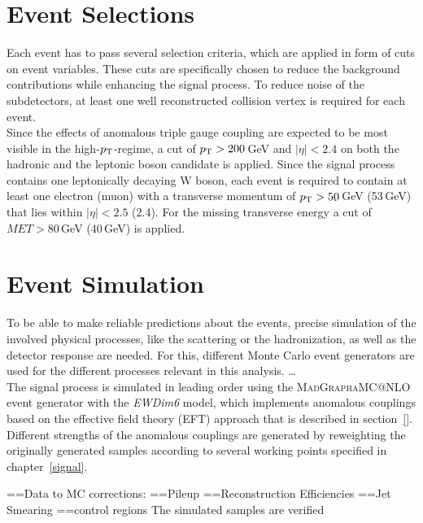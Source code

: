 \section{Event Selections}
\label{sec:eventselection}
Each event has to pass several selection criteria, which are applied in form of cuts on event variables. These cuts are specifically chosen to reduce the background contributions while enhancing the signal process. To reduce noise of the subdetectors, at least one well reconstructed collision vertex is required for each event.\\

\noindent Since the effects of anomalous triple gauge coupling are expected to be most visible in the high-$p_{\rm T}$-regime, a cut of $p_{\rm T}>200$\,GeV and $|\eta|<2.4$ on both the hadronic and the leptonic boson candidate is applied.
Since the signal process contains one leptonically decaying W boson, each event is required to contain at least one electron (muon) with a transverse momentum of $p_{\rm T}>50$\,GeV (53\,GeV) that lies within $|\eta|<2.5$ (2.4). For the missing transverse energy a cut of $MET>80$\,GeV (40\,GeV) is applied. 

\section{Event Simulation}
\label{sec:MC}
To be able to make reliable predictions about the events, precise simulation of the involved physical processes, like the scattering or the hadronization, as well as the detector response are needed. For this, different Monte Carlo event generators are used for the different processes relevant in this analysis.
\dots \\
The signal process is simulated in leading order using the \textsc{MadGraph\textunderscore aMC@NLO} event generator with the \textit{EWDim6} model\cite{madgraph}, which implements anomalous couplings based on the effective field theory (EFT) approach that is described in section~\ref{}. Different strengths of the anomalous couplings are generated by reweighting the originally generated samples according to several working points specified in chapter~\ref{signal}.


=={Data to MC corrections:}
=={Pileup}
=={Reconstruction Efficiencies}
=={Jet Smearing}
=={control regions}
The simulated samples are verified 
